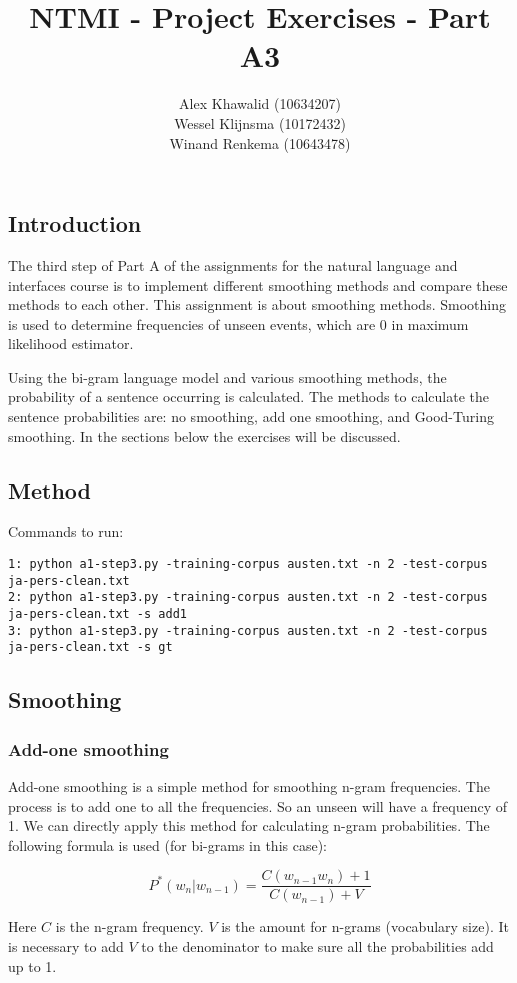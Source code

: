 \documentclass[a4paper, 10pt]{article}
\title{NTMI - Project Exercises - Part A3}
\author{Alex Khawalid (10634207)\\
Wessel Klijnsma (10172432)\\
Winand Renkema (10643478)\\
}
\begin{document}
\maketitle
\subsection*{Introduction}
The third step of Part A of the assignments for the natural language and interfaces course is to implement different smoothing methods and compare these methods to each other. This assignment is about smoothing methods. Smoothing is used to determine frequencies of unseen events, which are $0$ in maximum likelihood estimator.

Using the bi-gram language model and various smoothing methods, the probability of a sentence occurring is calculated. The methods to calculate the sentence probabilities are: no smoothing, add one smoothing, and Good-Turing smoothing. In the sections below the exercises will be discussed.

\subsection*{Method}

Commands to run: 
\begin{verbatim}
1: python a1-step3.py -training-corpus austen.txt -n 2 -test-corpus ja-pers-clean.txt
2: python a1-step3.py -training-corpus austen.txt -n 2 -test-corpus ja-pers-clean.txt -s add1
3: python a1-step3.py -training-corpus austen.txt -n 2 -test-corpus ja-pers-clean.txt -s gt
\end{verbatim}

\subsection*{Smoothing}
\subsubsection*{Add-one smoothing}
Add-one smoothing is a simple method for smoothing n-gram frequencies. The process is to add one to all the frequencies. So an unseen will have a frequency of 1. We can directly apply this method for calculating n-gram probabilities. The following formula is used (for bi-grams in this case):

$$
P^{*}(w_n | w_{n-1}) = \frac{C(w_{n-1}w_n)+1}{C(w_{n-1})+V}
$$

Here $C$ is the n-gram frequency. $V$ is the amount for n-grams (vocabulary size). It is necessary to add $V$ to the denominator to make sure all the probabilities add up to 1. 
\end{document}
